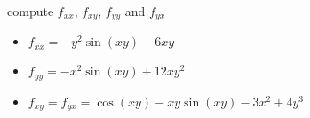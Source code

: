 compute $f_{xx}$, $f_{xy}$, $f_{yy}$ and $f_{yx}$

\soln*

\begin{itemize}
    \item $f_{xx} = -y^2 \sin(xy) - 6xy$
    \item $f_{yy} = -x^2 \sin(xy) + 12xy^2$
    \item $f_{xy} = f_{yx} = \cos(xy) - xy \sin(xy) -3x^2 + 4y^3$ 
\end{itemize}